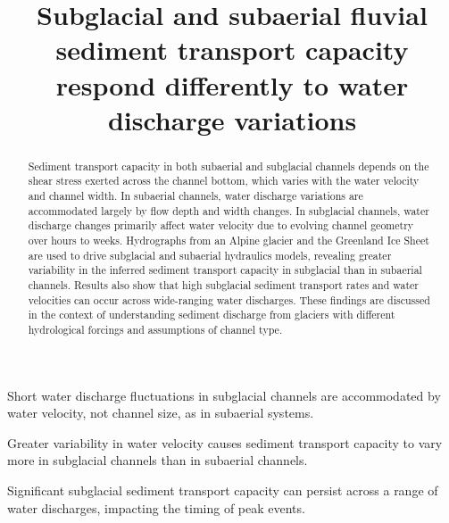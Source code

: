 \documentclass[draft]{agujournal2019}
\begin{document}
\title{Subglacial and subaerial fluvial sediment transport capacity respond differently to water discharge variations}




\begin{keypoints}
\item Short water discharge fluctuations in subglacial channels are accommodated by water velocity, not channel size, as in subaerial systems.
\item Greater variability in water velocity causes sediment transport capacity to vary more in subglacial channels than in subaerial channels.
\item Significant subglacial sediment transport capacity can persist across a range of water discharges, impacting the  timing of peak events.
\end{keypoints}

\begin{abstract}
  Sediment transport capacity in both subaerial and subglacial channels depends on the shear stress exerted across the channel bottom, which varies with the water velocity and channel width.
  In subaerial channels, water discharge variations are accommodated largely by flow depth and width changes.
  In subglacial channels, water discharge changes primarily affect water velocity due to evolving channel geometry over hours to weeks.
  Hydrographs from an Alpine glacier and the Greenland Ice Sheet are used to drive subglacial and subaerial hydraulics models, revealing greater variability in the inferred sediment transport capacity in subglacial than in subaerial channels.
  Results also show that high subglacial sediment transport rates and water velocities can occur across wide-ranging water discharges.
  These findings are discussed in the context of understanding sediment discharge from glaciers with different hydrological forcings and assumptions of channel type.
\end{abstract}
\end{document}
